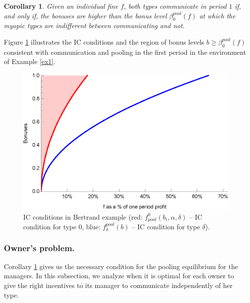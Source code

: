\documentclass[]{article}
\newtheorem{corollary}{Corollary}
\begin{document}
\begin{corollary}\label{cor:pool_bonuses}
Given an individual fine $f$, both types communicate in period $1$ if, and only if, the bonuses are higher than the bonus level $\beta^{pool}_0(f)$ at which the myopic types are indifferent between communicating and not.
\end{corollary}

Figure \ref{fig:pool_IC_bonuses} illustrates the IC conditions and the region of bonus levels $b\geq\beta^{pool}_0(f)$ consistent with communication and pooling in the first period in the environment of Example \ref{ex1}.
%
\begin{figure}[h!]
\centering
\includegraphics[scale=0.8]{Plots/Bertrand_bonuses_diff_bonus_pool.eps}
\caption{IC conditions in Bertrand example (red: $f^{0}_{pool}(b_i,\alpha,\delta)$ -- IC condition for type $0$, blue: $f^{pool}_\delta(b)$ -- IC condition for type $\delta$).}\label{fig:pool_IC_bonuses}
\end{figure}

\subsubsection*{Owner's problem.} 

Corollary \ref{cor:pool_bonuses} gives us the necessary condition for the pooling equilibrium for the managers. In this subsection, we analyze when it is optimal for each owner to give the right incentives to its manager to communicate independently of her type.
\end{document}
